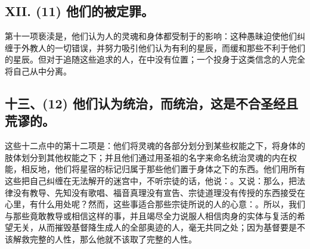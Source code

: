 
\subsection{XII. (11) 他们的被定罪。}

第十一项亵渎是，他们认为人的灵魂和身体都受制于的影响：这种愚昧迫使他们纠缠于外教人的一切错误，并努力吸引他们认为有利的星辰，而缓和那些不利于他们的星辰。但对于追随这些追求的人，在中没有位置；一个投身于这类信念的人完全将自己从中分离。\par


\subsection{十三、(12) 他们认为统治，而统治，这是不合圣经且荒谬的。}

这些十二点中的第十二项是：他们将灵魂的各部分划分到某些权能之下，将身体的肢体划分到其他权能之下；并且他们通过用圣祖的名字来命名统治灵魂的内在权能，相反地，他们将星宿的标记归属于那些他们置于身体之下的东西。他们用所有这些把自己纠缠在无法解开的迷宫中，不听宗徒的话，他说：。又说：那么，把法律没有教导、先知没有歌唱、福音真理没有宣告、宗徒道理没有传授的东西接受在心里，有什么用处呢？然而，这些事适合那些宗徒所说的人的心意：。所以，我们与那些竟敢教导或相信这样的事，并且竭尽全力说服人相信肉身的实体与复活的希望无关，从而摧毁基督降生成人的全部奥迹的人，毫无共同之处；因为基督要是不该解救完整的人性，那么他就不该取了完整的人性。\par


